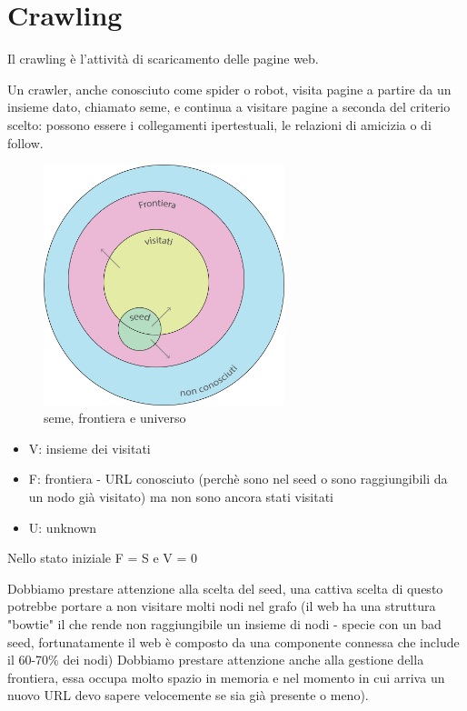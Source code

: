 \documentclass[12pt,italian]{report}
\begin{document}
\frontespizio 

\beforepreface
\afterpreface

\chapter{Crawling}
\label{cap:crawling}

Il crawling è l'attività di scaricamento delle pagine web.

Un crawler, anche conosciuto come spider o robot, visita pagine a partire da un insieme dato, chiamato seme, e continua a visitare pagine a seconda del criterio scelto: possono essere i collegamenti ipertestuali, le relazioni di amicizia o di follow.

\begin{figure}[h]
	\centering
	\includegraphics[width=70mm]{image/seed_frontiera_universo.png}
	\caption{seme, frontiera e universo}
	\label{fig:seme_front_universe}
\end{figure}

\begin{itemize}
    \item V: insieme dei visitati
    \item F: frontiera - URL conosciuto (perchè sono nel seed o sono raggiungibili da un nodo già visitato) ma non sono ancora stati visitati
    \item U: unknown
\end{itemize}
Nello stato iniziale F = S e V = 0

Dobbiamo prestare attenzione alla scelta del seed, una cattiva scelta di questo potrebbe portare a non visitare molti nodi nel grafo (il web ha una struttura "bowtie" il che rende non raggiungibile un insieme di nodi - specie con un bad seed, fortunatamente il web è composto da una componente connessa che include il 60-70\% dei nodi)
Dobbiamo prestare attenzione anche alla gestione della frontiera, essa occupa molto spazio in memoria e nel momento in cui arriva un nuovo URL devo sapere velocemente se sia già presente o meno).
\end{document}
